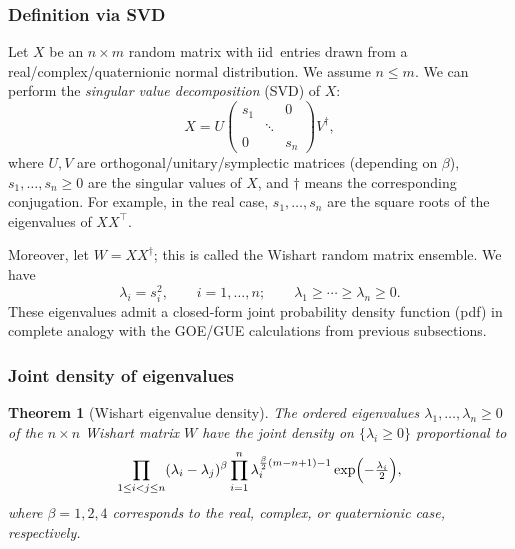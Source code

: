 \documentclass[letterpaper,11pt,oneside,reqno]{book}
\numberwithin{equation}{chapter}  %
\newtheorem{theorem}[proposition]{Theorem}
\theoremstyle{definition}
\begin{document}
\subsubsection{Definition via SVD}

Let $X$ be an $n\times m$ random matrix with iid\ entries drawn from a real/complex/quaternionic normal distribution. We assume $n \leq m$.
We can perform the \emph{singular value decomposition} (SVD) of $X$:
\[
    X = U
    \begin{pmatrix}
        s_1 &        & 0 \\
             &\ddots &    \\
         0  &        & s_n
    \end{pmatrix}
    V^\dagger,
\]
where $U,V$ are orthogonal/unitary/symplectic matrices (depending on $\beta$), $s_1,\dots,s_n\geq 0$ are the singular values of $X$, and $\dagger$
means the corresponding conjugation.
For example, in the real case, $s_1,\ldots,s_n $ are
the square roots of the eigenvalues of $X X^\top$.

Moreover, let $W=XX^\dagger$; this is called the Wishart
random matrix ensemble. We have
\[
    \lambda_i = s_i^2,\qquad i=1,\ldots,n;
		\qquad
		\lambda_1\ge \cdots \ge \lambda_n\ge 0.
\]
These eigenvalues admit a closed-form joint probability density function (pdf) in complete analogy with the GOE/GUE calculations from previous subsections.

\subsubsection{Joint density of eigenvalues}

\begin{theorem}[Wishart eigenvalue density]
\label{lecture3:thm:Wishart-Distribution}
The ordered eigenvalues $\lambda_1,\dots,\lambda_n \geq 0$ of
the $n\times n$ Wishart matrix
$W$ have the joint density on $\{\lambda_i\geq 0\}$ proportional to
\[
    \prod_{1 \leq i < j \leq n}
    (\lambda_i - \lambda_j)^\beta
    \prod_{i=1}^n
    \lambda_i^{\frac{\beta}{2}(m - n + 1)-1}
    \exp\Bigl(-\tfrac{\lambda_i}{2}\Bigr),
\]
where $\beta=1,2,4$ corresponds to the real, complex, or
quaternionic case, respectively.
\end{theorem}
\end{document}
